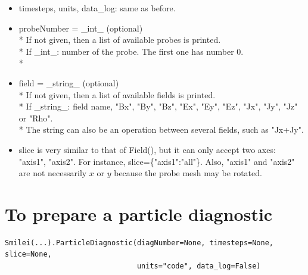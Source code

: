 \documentclass[11pt]{article}
\newcommand{\code}[1]{\colorbox{yellow!15}{\ttfamily #1}}
\begin{document}
\begin{itemize}
\item \code{timesteps}, \code{units}, \code{data\_log}: same as before.
\item \code{probeNumber} = \code{\_int\_} (optional)\\*
	If not given, then a list of available probes is printed.\\*
	If \code{\_int\_}: number of the probe. The first one has number 0.\\*
\item \code{field} = \code{\_string\_} (optional)\\*
	If not given, then a list of available fields is printed.\\*
	If \code{\_string\_}: field name, \code{"Bx"}, \code{"By"}, \code{"Bz"}, \code{"Ex"}, \code{"Ey"}, \code{"Ez"}, \code{"Jx"}, \code{"Jy"}, \code{"Jz"} or \code{"Rho"}.\\*
	The string can also be an operation between several fields, such as \code{"Jx+Jy"}.
\item \code{slice} is very similar to that of \code{Field()}, but it can only accept two axes: \code{"axis1"}, \code{"axis2"}.
	For instance, \code{slice=\{"axis1":"all"\}}. Also, \code{"axis1"} and \code{"axis2"} are not necessarily $x$ or $y$ because the probe mesh may be rotated.
\end{itemize}
\vspace{0.5cm}


\section{To prepare a particle diagnostic}

\begin{lstlisting}
Smilei(...).ParticleDiagnostic(diagNumber=None, timesteps=None, slice=None,
                               units="code", data_log=False)
\end{lstlisting}
\end{document}
